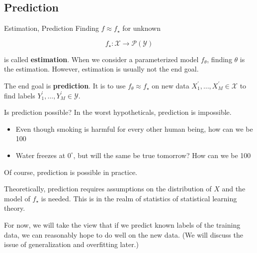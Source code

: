 \subsection{Prediction}

\begin{frame}[allowframebreaks]

\begin{mydefinitionblock}{3.17}{Estimation, Prediction}
    Finding $f \approx f_{\star}$ for unknown

    $$
    f_{\star}: \mathcal{X} \rightarrow \mathcal{P}(\mathcal{Y})
    $$

    is called \textbf{estimation}. When we consider a parameterized model $f_{\theta}$, finding $\theta$ is the estimation. However, estimation is usually not the end goal.

    The end goal is \textbf{prediction}. It is to use $f_{\theta} \approx f_{\star}$ on new data $X_{1}^{\prime}, \ldots, X_{M}^{\prime} \in \mathcal{X}$ to find labels $Y_{1}^{\prime}, \ldots, Y_{M}^{\prime} \in \mathcal{Y}$.
\end{mydefinitionblock}

\end{frame}

\begin{frame}[allowframebreaks]

\begin{myconceptblock}{3.18}{Is prediction possible?}
    In the worst hypotheticals, prediction is impossible.

    \begin{itemize}
        \item Even though smoking is harmful for every other human being, how can we be 100%
        \item Water freezes at $0^{\circ}$, but will the same be true tomorrow? How can we be 100%
    \end{itemize}

    Of course, prediction is possible in practice.

    Theoretically, prediction requires assumptions on the distribution of $X$ and the model of $f_{\star}$ is needed. This is in the realm of statistics of statistical learning theory.

    For now, we will take the view that if we predict known labels of the training data, we can reasonably hope to do well on the new data. (We will discuss the issue of generalization and overfitting later.)
\end{myconceptblock}

\end{frame}

